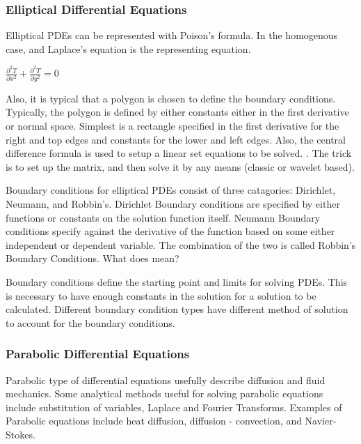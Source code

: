 \subsubsection {Elliptical Differential Equations} 
Elliptical PDEs can be represented with Poison's formula.  In the homogenous case, and Laplace's equation is the representing equation.

$\frac{\partial ^2 T} {\partial x^2} + \frac{\partial ^2 T} {\partial y^2} = 0$  

Also, it is typical that a polygon is chosen to define the boundary conditions.   Typically, the polygon is defined by either constants either in the first derivative or normal space.  %
Simplest is a rectangle specified in the first derivative for the right and top edges and constants for the lower and left edges.  Also, the central difference formula is used to setup a linear set equations to be solved.  \cite{appliedmethods}.  The trick is to set up the matrix, and then solve it by any means (classic or wavelet based).  

Boundary conditions for elliptical PDEs consist of three catagories: Dirichlet, Neumann, and Robbin's.  Dirichlet Boundary conditions are specified by either functions or constants on the solution function itself.  Neumann Boundary conditions specify against the derivative of the function based on some either independent or dependent variable.  The combination of the two is called Robbin's Boundary Conditions.  What does mean?

Boundary conditions define the starting point and limits for solving PDEs.  This is necessary to have enough constants in the solution for a solution to be calculated.  Different boundary condition types have different method of solution to account for the boundary conditions.  

\subsubsection {Parabolic Differential Equations}
Parabolic type of differential equations usefully describe diffusion and fluid mechanics.  Some analytical methods useful for solving parabolic equations include substitution of variables, Laplace and Fourier Transforms.  Examples of Parabolic equations include heat diffusion, diffusion - convection, and Navier-Stokes.  

